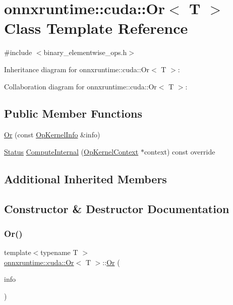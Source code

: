 \hypertarget{classonnxruntime_1_1cuda_1_1Or}{}\section{onnxruntime\+:\+:cuda\+:\+:Or$<$ T $>$ Class Template Reference}
\label{classonnxruntime_1_1cuda_1_1Or}


{\ttfamily \#include $<$binary\+\_\+elementwise\+\_\+ops.\+h$>$}



Inheritance diagram for onnxruntime\+:\+:cuda\+:\+:Or$<$ T $>$\+:


Collaboration diagram for onnxruntime\+:\+:cuda\+:\+:Or$<$ T $>$\+:
\subsection*{Public Member Functions}
\begin{DoxyCompactItemize}
\item 
\mbox{\hyperlink{classonnxruntime_1_1cuda_1_1Or_ac5520a8de29a9f3530fdb30fbf510061}{Or}} (const \mbox{\hyperlink{classonnxruntime_1_1OpKernelInfo}{Op\+Kernel\+Info}} \&info)
\item 
\mbox{\hyperlink{classonnxruntime_1_1common_1_1Status}{Status}} \mbox{\hyperlink{classonnxruntime_1_1cuda_1_1Or_ad39062a46531e065f5e124e60f45baa8}{Compute\+Internal}} (\mbox{\hyperlink{classonnxruntime_1_1OpKernelContext}{Op\+Kernel\+Context}} $\ast$context) const override
\end{DoxyCompactItemize}
\subsection*{Additional Inherited Members}


\subsection{Constructor \& Destructor Documentation}
\mbox{\label{classonnxruntime_1_1cuda_1_1Or_ac5520a8de29a9f3530fdb30fbf510061}} 
\subsubsection{\texorpdfstring{Or()}{Or()}}
{\footnotesize\ttfamily template$<$typename T $>$ \\
\mbox{\hyperlink{classonnxruntime_1_1cuda_1_1Or}{onnxruntime\+::cuda\+::\+Or}}$<$ T $>$\+::\mbox{\hyperlink{classonnxruntime_1_1cuda_1_1Or}{Or}} (\begin{DoxyParamCaption}\item[{const \mbox{\hyperlink{classonnxruntime_1_1OpKernelInfo}{Op\+Kernel\+Info}} \&}]{info }\end{DoxyParamCaption})\hspace{0.3cm}{\ttfamily [inline]}}



